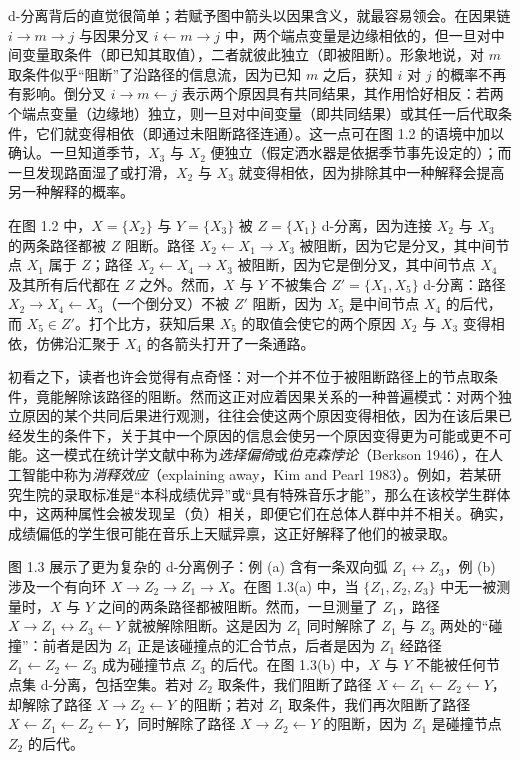 d-分离背后的直觉很简单；若赋予图中箭头以因果含义，就最容易领会。在因果链 $i\to m\to j$ 与因果分叉 $i\leftarrow m\to j$ 中，两个端点变量是边缘相依的，但一旦对中间变量取条件（即已知其取值），二者就彼此独立（即被阻断）。形象地说，对 $m$ 取条件似乎“阻断”了沿路径的信息流，因为已知 $m$ 之后，获知 $i$ 对 $j$ 的概率不再有影响。倒分叉 $i\to m\leftarrow j$ 表示两个原因具有共同结果，其作用恰好相反：若两个端点变量（边缘地）独立，则一旦对中间变量（即共同结果）或其任一后代取条件，它们就变得相依（即通过未阻断路径连通）。这一点可在图 1.2 的语境中加以确认。一旦知道季节，$X_3$ 与 $X_2$ 便独立（假定洒水器是依据季节事先设定的）；而一旦发现路面湿了或打滑，$X_2$ 与 $X_3$ 就变得相依，因为排除其中一种解释会提高另一种解释的概率。

在图 1.2 中，$X=\{X_2\}$ 与 $Y=\{X_3\}$ 被 $Z=\{X_1\}$ d-分离，因为连接 $X_2$ 与 $X_3$ 的两条路径都被 $Z$ 阻断。路径 $X_2\leftarrow X_1\to X_3$ 被阻断，因为它是分叉，其中间节点 $X_1$ 属于 $Z$；路径 $X_2\leftarrow X_4\to X_3$ 被阻断，因为它是倒分叉，其中间节点 $X_4$ 及其所有后代都在 $Z$ 之外。然而，$X$ 与 $Y$ 不被集合 $Z'=\{X_1,X_5\}$ d-分离：路径 $X_2\to X_4\leftarrow X_3$（一个倒分叉）不被 $Z'$ 阻断，因为 $X_5$ 是中间节点 $X_4$ 的后代，而 $X_5\in Z'$。打个比方，获知后果 $X_5$ 的取值会使它的两个原因 $X_2$ 与 $X_3$ 变得相依，仿佛沿汇聚于 $X_4$ 的各箭头打开了一条通路。

初看之下，读者也许会觉得有点奇怪：对一个并不位于被阻断路径上的节点取条件，竟能解除该路径的阻断。然而这正对应着因果关系的一种普遍模式：对两个独立原因的某个共同后果进行观测，往往会使这两个原因变得相依，因为在该后果已经发生的条件下，关于其中一个原因的信息会使另一个原因变得更为可能或更不可能。这一模式在统计学文献中称为\emph{选择偏倚}或\emph{伯克森悖论}（Berkson 1946），在人工智能中称为\emph{消释效应}（explaining away，Kim and Pearl 1983）。例如，若某研究生院的录取标准是“本科成绩优异”或“具有特殊音乐才能”，那么在该校学生群体中，这两种属性会被发现呈（负）相关，即便它们在总体人群中并不相关。确实，成绩偏低的学生很可能在音乐上天赋异禀，这正好解释了他们的被录取。

图 1.3 展示了更为复杂的 d-分离例子：例 (a) 含有一条双向弧 $Z_1\leftrightarrow Z_3$，例 (b) 涉及一个有向环 $X\to Z_2\to Z_1\to X$。在图 1.3(a) 中，当 $\{Z_1,Z_2,Z_3\}$ 中无一被测量时，$X$ 与 $Y$ 之间的两条路径都被阻断。然而，一旦测量了 $Z_1$，路径 $X\to Z_1\leftrightarrow Z_3\leftarrow Y$ 就被解除阻断。这是因为 $Z_1$ 同时解除了 $Z_1$ 与 $Z_3$ 两处的“碰撞”：前者是因为 $Z_1$ 正是该碰撞点的汇合节点，后者是因为 $Z_1$ 经路径 $Z_1\leftarrow Z_2\leftarrow Z_3$ 成为碰撞节点 $Z_3$ 的后代。在图 1.3(b) 中，$X$ 与 $Y$ 不能被任何节点集 d-分离，包括空集。若对 $Z_2$ 取条件，我们阻断了路径 $X\leftarrow Z_1\leftarrow Z_2\leftarrow Y$，却解除了路径 $X\to Z_2\leftarrow Y$ 的阻断；若对 $Z_1$ 取条件，我们再次阻断了路径 $X\leftarrow Z_1\leftarrow Z_2\leftarrow Y$，同时解除了路径 $X\to Z_2\leftarrow Y$ 的阻断，因为 $Z_1$ 是碰撞节点 $Z_2$ 的后代。


